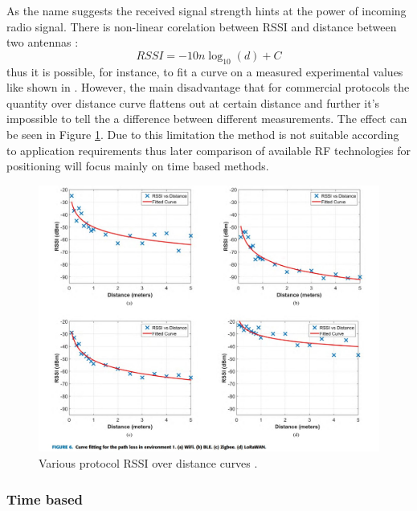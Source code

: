 As the name suggests the received signal strength hints at the power of incoming radio signal. There is non-linear corelation between RSSI and distance between two antennas \cite{rssi-curves}:
$$
R S S I=-10 n \log _{10}(d)+C
$$
thus it is possible, for instance, to fit a curve on a measured experimental values like shown in \cite{rssi-curves}. However, the main disadvantage that for commercial protocols the quantity over distance curve flattens out at certain distance and further it's impossible to tell the a difference between different measurements. The effect can be seen in Figure \ref{fig:rssi-curves}. Due to this limitation the method is not suitable according to application requirements thus later comparison of available RF technologies for positioning will focus mainly on time based methods.
\begin{figure}
    \includegraphics[width=\linewidth]{figures/RSSICurves.jpg}
    \caption{Various protocol RSSI over distance curves \cite{rssi-curves}.}
    \label{fig:rssi-curves}
\end{figure}
  
\subsubsection{Time based}

